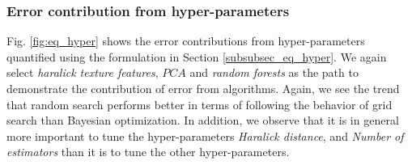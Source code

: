 \subsubsection{Error contribution from hyper-parameters}

Fig. \ref{fig:eq_hyper} shows the error contributions from hyper-parameters quantified using the formulation in Section \ref{subsubsec_eq_hyper}. We again select \textit{haralick texture features}, $PCA$ and \textit{random forests} as the path to demonstrate the contribution of error from algorithms. Again, we see the trend that random search performs better in terms of following the behavior of grid search than Bayesian optimization. In addition, we observe that it is in general more important to tune the hyper-parameters \textit{Haralick distance}, and \textit{Number of estimators} than it is to tune  the other hyper-parameters.

